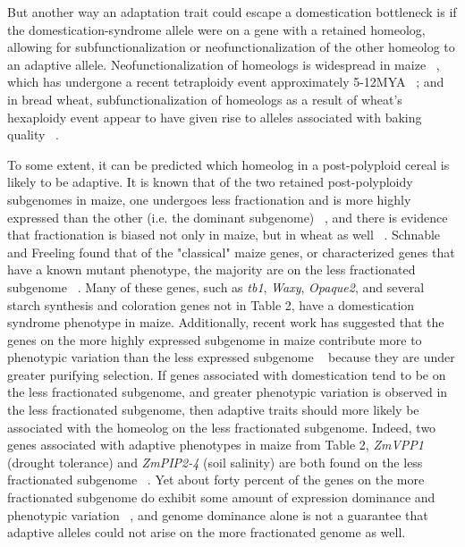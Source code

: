 \documentclass[12pt]{article}
\begin{document}
But another way an adaptation trait could escape a domestication bottleneck is if the domestication-syndrome allele were on a gene with a retained homeolog, allowing for subfunctionalization or neofunctionalization of the other homeolog to an adaptive allele.  Neofunctionalization of homeologs is widespread in maize ~\citep{Hughes2014}, which has undergone a recent tetraploidy event approximately 5-12MYA ~\citep{Swigonova2004}; and in bread wheat, subfunctionalization of homeologs as a result of  wheat's hexaploidy event appear to have given rise to alleles associated with baking quality ~\citep{Pfeifer2014}.  

To some extent, it can be predicted which homeolog in a post-polyploid cereal is likely to be adaptive. It is known that of the two retained post-polyploidy subgenomes in maize, one undergoes less fractionation and is more highly expressed than the other (i.e. the dominant subgenome) ~\citep{Woodhouse2010, Schnable2011}, and there is evidence that fractionation is biased not only in maize, but in wheat as well ~\citep{Eckardt2014}.  Schnable and Freeling found that of the "classical" maize genes, or characterized genes that have a known mutant phenotype, the majority are on the less fractionated subgenome ~\citep{Schnable20112}. Many of these genes, such as \textit{tb1}, \textit{Waxy}, \textit{Opaque2}, and several starch synthesis and coloration genes not in Table 2, have a domestication syndrome phenotype in maize.  Additionally, recent work has suggested that the genes on the more highly expressed subgenome in maize contribute more to phenotypic variation than the less expressed subgenome ~\citep{RennyByfield2017} because they are under greater purifying selection.  If genes associated with domestication tend to be on the less fractionated subgenome, and greater phenotypic variation is observed in the less fractionated subgenome, then adaptive traits should more likely be associated with the homeolog on the less fractionated subgenome.  Indeed, two genes associated with adaptive phenotypes in maize from Table 2, \textit{ZmVPP1} (drought tolerance) and \textit{ZmPIP2-4} (soil salinity) are both found on the less fractionated subgenome ~\citep{Schnable20112}. Yet about forty percent of the genes on the more fractionated subgenome do exhibit some amount of expression dominance and phenotypic variation ~\citep{RennyByfield2017}, and genome dominance alone is not a guarantee that adaptive alleles could not arise on the more fractionated genome as well.  
\end{document}
